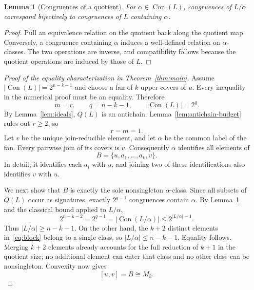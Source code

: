 \documentclass[11pt,a4paper]{article}
\numberwithin{equation}{section}
\newtheorem{lemma}[theorem]{Lemma}
\theoremstyle{definition}
\theoremstyle{remark}
\DeclareMathOperator{\Con}{Con}
\newcommand{\card}[1]{\lvert #1\rvert}
\begin{document}
\begin{lemma}[Congruences of a quotient]\label{lem:quotient}
For $\alpha\in\Con(L)$, congruences of $L/\alpha$ correspond bijectively to
congruences of $L$ containing $\alpha$.
\end{lemma}
\begin{proof}
Pull an equivalence relation on the quotient back along the quotient map.
Conversely, a congruence containing $\alpha$ induces a well-defined relation on
$\alpha$-classes. The two operations are inverse, and compatibility follows
because the quotient operations are induced by those of $L$.
\end{proof}

\begin{proof}[Proof of the equality characterization in Theorem~\ref{thm:main}]
Assume $\card{\Con(L)}=2^{n-k-1}$ and choose a fan of $k$ upper covers of $u$.
Every inequality in the numerical proof must be an equality. Therefore
\begin{equation}\label{eq:equality-budget}
 m=r,\qquad q=n-k-1,\qquad \card{\Con(L)}=2^q.
\end{equation}
By Lemma~\ref{lem:ideals}, $Q(L)$ is an antichain.
Lemma~\ref{lem:antichain-budget} rules out $r\ge2$, so
\begin{equation}\label{eq:one-reducible}
 r=m=1.
\end{equation}
Let $v$ be the unique join-reducible element, and let $\alpha$ be the common
label of the fan. Every pairwise join of its covers is $v$.
Consequently $\alpha$ identifies all elements of
\begin{equation}\label{eq:block}
 B=\{u,a_1,\ldots,a_k,v\}.
\end{equation}
In detail, it identifies each $a_i$ with $u$, and joining two of these
identifications also identifies $v$ with $u$.

We next show that $B$ is exactly the sole nonsingleton $\alpha$-class.
Since all subsets of $Q(L)$ occur as signatures, exactly $2^{q-1}$ congruences
contain $\alpha$. By Lemma~\ref{lem:quotient} and the classical bound applied
to $L/\alpha$,
\begin{equation}\label{eq:quotient-lower}
 2^{n-k-2}=2^{q-1}
   =\card{\Con(L/\alpha)}\le2^{\card{L/\alpha}-1}.
\end{equation}
Thus $\card{L/\alpha}\ge n-k-1$.
On the other hand, the $k+2$ distinct elements in~\eqref{eq:block} belong to a
single class, so $\card{L/\alpha}\le n-k-1$.
Equality follows. Merging $k+2$ elements already accounts for the full reduction
of $k+1$ in the quotient size; no additional element can enter that class and no
other class can be nonsingleton. Convexity now gives
\begin{equation}\label{eq:interval-diamond}
 [u,v]=B\cong M_k.
\end{equation}


\end{proof}
\end{document}
